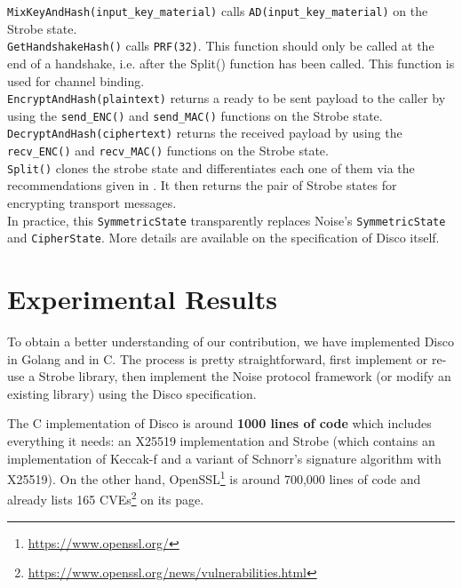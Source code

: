 \documentclass{article}
\begin{document}
\texttt{MixKeyAndHash(input_key_material)} calls \texttt{AD(input_key_material)} on the Strobe state.\\

\texttt{GetHandshakeHash()} calls \texttt{PRF(32)}. This function should only be called at the end of a handshake, i.e. after the Split() function has been called. This function is used for channel binding\cite[Section 11.2]{noise}.\\

\texttt{EncryptAndHash(plaintext)} returns a ready to be sent payload to the caller by using the \texttt{send_ENC()} and \texttt{send_MAC()} functions on the Strobe state.\\

\texttt{DecryptAndHash(ciphertext)} returns the received payload by using the \texttt{recv_ENC()} and \texttt{recv_MAC()} functions on the Strobe state.\\

\texttt{Split()} clones the strobe state and differentiates each one of them via the recommendations given in \cite[Appendix C.1.]{strobe}. It then returns the pair of Strobe states for encrypting transport messages.\\

In practice, this \texttt{SymmetricState} transparently replaces Noise's \texttt{SymmetricState} and \texttt{CipherState}. More details are available on the specification of Disco itself\cite{disco}.

\section{Experimental Results}

To obtain a better understanding of our contribution, we have implemented Disco in Golang\cite{libdisco} and in C\cite{disco-c}. The process is pretty straightforward, first implement or re-use a Strobe library, then implement the Noise protocol framework (or modify an existing library) using the Disco specification.

The C implementation of Disco is around \textbf{1000 lines of code} which includes everything it needs: an X25519 implementation and Strobe (which contains an implementation of Keccak-f and a variant of Schnorr's signature algorithm with X25519). On the other hand, OpenSSL\footnote{\url{https://www.openssl.org/}} is around 700,000 lines of code and already lists 165 CVEs\footnote{\url{https://www.openssl.org/news/vulnerabilities.html}} on its page.
\end{document}
